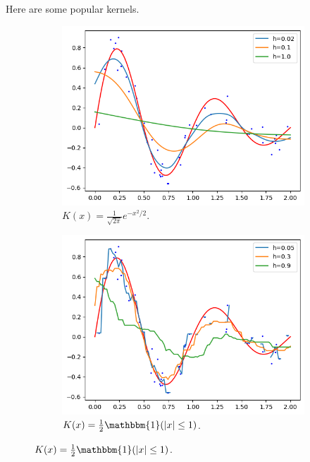   \begin{example}
    Here are some popular kernels. 
    \begin{figure}[H]
      \centering
      \begin{subfigure}[b]{0.32\textwidth}
        \centering
        \includegraphics[scale=0.33]{img/gaussian_smoother.png}
        \caption{$K(x) = \frac{1}{\sqrt{2 \pi}} e^{-x^2/2}$. } 
        \label{fig:gaussian_smoother}
      \end{subfigure}
      \hfill 
      \begin{subfigure}[b]{0.32\textwidth}
        \centering
        \includegraphics[scale=0.33]{img/boxcar_smoother.png}
        \caption{$K(x) = \frac{1}{2} \mathbbm{1}(|x| \leq 1)$.} 

\end{subfigure}
\end{figure}
\end{example}

